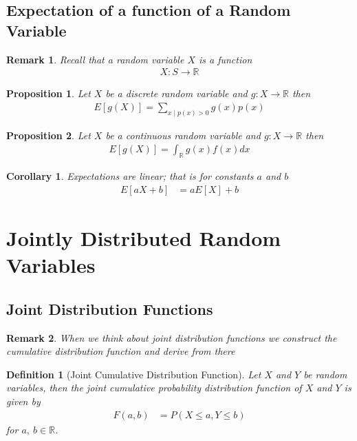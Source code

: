 \documentclass[11pt, oneside]{book}   	%
\newtheorem{definition}{Definition}[chapter]
\newtheorem{remark}{Remark}[chapter]
\newtheorem{corollary}{Corollary}[chapter]
\newtheorem{proposition}{Proposition}[chapter]
\newcommand{\paren}[1]{\left(#1\right)}
\begin{document}
\begin{spacing}{1.618}
\subsection{Expectation of a function of a Random Variable}

\begin{remark}
	Recall that a random variable $X$ is a function 
	\begin{alignat}{4}
		X:S\to \mathbb{R}
	\end{alignat}
\end{remark}

\begin{proposition}
	Let $X$ be a discrete random variable and $g:X\to \mathbb{R}$ then 
	\begin{alignat}{4}
		E[g(X)]=\sum_{x\mid p(x)>0}g(x)p(x)
	\end{alignat}
\end{proposition}

\begin{proposition}
	Let $X$ be a continuous random variable and $g:X\to\mathbb{R}$ then 
	\begin{alignat}{4}
		E[g(X)]=\int_{\mathbb{R}}g(x)f(x)dx
	\end{alignat}
\end{proposition}

\begin{corollary}
	Expectations are linear; that is for constants $a$ and $b$
	\begin{alignat}{4}
		E[aX+b]&=aE[X]+b
	\end{alignat}
\end{corollary}

\section{Jointly Distributed Random Variables}

\subsection{Joint Distribution Functions}

\begin{remark}
	When we think about joint distribution functions we construct the cumulative distribution function and derive from there
\end{remark}

\begin{definition}[Joint Cumulative Distribution Function]
	Let $X$ and $Y$ be random variables, then the \emph{joint cumulative probability distribution function} of $X$ and $Y$ is given by
	\begin{alignat}{4}
		F(a, b)&=P\paren{X\leq a, Y\leq b}
	\end{alignat}
	for $a,~b\in\mathbb{R}$. 
\end{definition}


\end{spacing}
\end{document}
